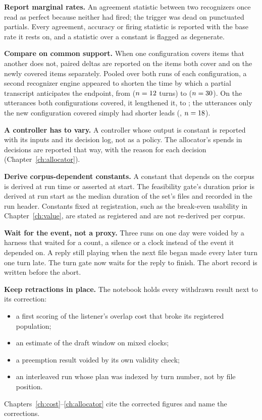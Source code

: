 \textbf{Report marginal rates.} An agreement statistic between two
recognizers once read as perfect because neither had fired; the trigger was
dead on punctuated partials. Every agreement, accuracy or firing statistic is
reported with the base rate it rests on, and a statistic over a constant is
flagged as degenerate.

\textbf{Compare on common support.} When one configuration covers items that
another does not, paired deltas are reported on the items both cover and on
the newly covered items separately. Pooled over both runs of each
configuration, a second recognizer engine appeared to shorten the time by
which a partial transcript anticipates the endpoint, from \LeadOne{}
($n=12$ turns) to \LeadShared{} ($n=30$). On the utterances
both configurations covered, it lengthened it, to \LeadSharedCS; the
utterances only the new configuration covered simply had shorter leads
(\LeadNew, $n=18$).

\textbf{A controller has to vary.} A controller whose output is constant is
reported with its inputs and its decision log, not as a policy. The
allocator's \AllocSpends{} spends in \AllocDecisions{} decisions are reported
that way, with the reason for each decision (Chapter~\ref{ch:allocator}).

\textbf{Derive corpus-dependent constants.} A constant that depends on the
corpus is derived at run time or asserted at start. The feasibility gate's
duration prior is derived at run start as the median duration of the set's
files and recorded in the run header. Constants fixed at registration, such as
the break-even usability in Chapter~\ref{ch:value}, are stated as registered
and are not re-derived per corpus.

\textbf{Wait for the event, not a proxy.} Three runs on one day were voided by
a harness that waited for a count, a silence or a clock instead of the event
it depended on. A reply still playing when the next file began made every
later turn one turn late. The turn gate now waits for the reply to finish.
The abort record is written before the abort.

\textbf{Keep retractions in place.} The notebook holds every withdrawn result
next to its correction:
\begin{itemize}
\item a first scoring of the listener's overlap cost that broke its registered
  population;
\item an estimate of the draft window on mixed clocks;
\item a preemption result voided by its own validity check;
\item an interleaved run whose plan was indexed by turn number, not by file
  position.
\end{itemize}
Chapters~\ref{ch:cost}--\ref{ch:allocator} cite the corrected figures and
name the corrections.
